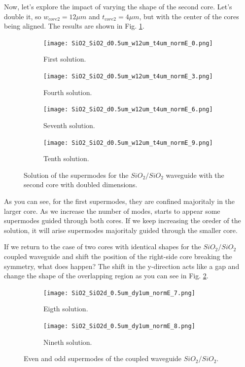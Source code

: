 \documentclass[a4paper,12pt]{article}
\begin{document}
Now, let's explore the impact of varying the shape of the 
second core. Let's double it, so $w_{core2} = 12\mu m$ and $t_{core2} = 4 \mu m$, but with the center of the cores being aligned. The results are shown in Fig. \ref{fig:double_size}.

\begin{figure}[H]
    \centering
    \begin{subfigure}{0.45\textwidth}
        \centering
        \texttt{[image: SiO2\_SiO2\_d0.5um\_w12um\_t4um\_normE\_0.png]}
        \caption{First solution.}
    \end{subfigure}
    \hfill
    \begin{subfigure}{0.45\textwidth}
        \centering
        \texttt{[image: SiO2\_SiO2\_d0.5um\_w12um\_t4um\_normE\_3.png]}
        \caption{Fourth solution.}
    \end{subfigure}
    \hfill
    \begin{subfigure}{0.45\textwidth}
        \centering
        \texttt{[image: SiO2\_SiO2\_d0.5um\_w12um\_t4um\_normE\_6.png]}
        \caption{Seventh solution.}
    \end{subfigure}
    \hfill
    \begin{subfigure}{0.45\textwidth}
        \centering
        \texttt{[image: SiO2\_SiO2\_d0.5um\_w12um\_t4um\_normE\_9.png]}
        \caption{Tenth solution.}
    \end{subfigure}
    \caption{Solution of the supermodes for the $SiO_2/SiO_2$ waveguide with the second core with doubled dimensions.}
    \label{fig:double_size}
\end{figure}

As you can see, for the first supermodes, they are confined majoritaly in the larger core. As we increase the number of modes, starts to appear some supermodes guided through both cores. If we keep increasing the oreder of the solution, it will arise supermodes majoritaly guided through the smaller core. 

If we return to the case of two cores with identical shapes for the $SiO_2/SiO_2$ coupled waveguide and shift the position of the right-side core breaking the symmetry, what does happen? The shift in the y-direction acts like a gap and change the shape of the overlapping region as you can see in Fig. \ref{fig:shifted_core2}.

\begin{figure}[H]
    \centering
    \begin{subfigure}{0.45\textwidth}
        \centering
        \texttt{[image: SiO2\_SiO2d\_0.5um\_dy1um\_normE\_7.png]}
        \caption{Eigth solution.}
    \end{subfigure}
    \hfill
    \begin{subfigure}{0.45\textwidth}
        \centering
        \texttt{[image: SiO2\_SiO2d\_0.5um\_dy1um\_normE\_8.png]}
        \caption{Nineth solution.}
    \end{subfigure}
    \caption{Even and odd supermodes of the coupled waveguide $SiO_2/SiO_2$.}
    \label{fig:shifted_core2}
\end{figure}
\end{document}
